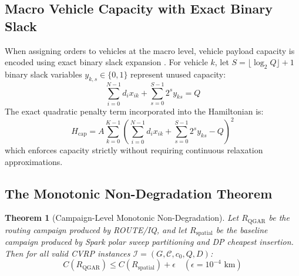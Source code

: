 \documentclass[journal,10pt]{IEEEtran}
\newtheorem{theorem}{Theorem}
\begin{document}
\subsection{Macro Vehicle Capacity with Exact Binary Slack}
When assigning orders to vehicles at the macro level, vehicle payload capacity is encoded using exact binary slack expansion \cite{harwood2021formulating}. For vehicle $k$, let $S = \lfloor \log_2 Q \rfloor + 1$ binary slack variables $y_{k, s} \in \{0, 1\}$ represent unused capacity:
\begin{equation}
\sum_{i=0}^{N-1} d_i x_{ik} + \sum_{s=0}^{S-1} 2^s y_{ks} = Q
\end{equation}
The exact quadratic penalty term incorporated into the Hamiltonian is:
\begin{equation}
H_{\text{cap}} = A \sum_{k=0}^{K-1} \left( \sum_{i=0}^{N-1} d_i x_{ik} + \sum_{s=0}^{S-1} 2^s y_{ks} - Q \right)^2
\end{equation}
which enforces capacity strictly without requiring continuous relaxation approximations.

\subsection{The Monotonic Non-Degradation Theorem}
\begin{theorem}[Campaign-Level Monotonic Non-Degradation]
Let $R_{\text{QGAR}}$ be the routing campaign produced by ROUTE/IQ, and let $R_{\text{spatial}}$ be the baseline campaign produced by Spark polar sweep partitioning and DP cheapest insertion. Then for all valid CVRP instances $\mathcal{I} = (G, \mathcal{C}, c_0, Q, D)$:
\begin{equation}
C(R_{\text{QGAR}}) \le C(R_{\text{spatial}}) + \epsilon \quad (\epsilon = 10^{-4}\text{ km})
\end{equation}
\end{theorem}
\end{document}
